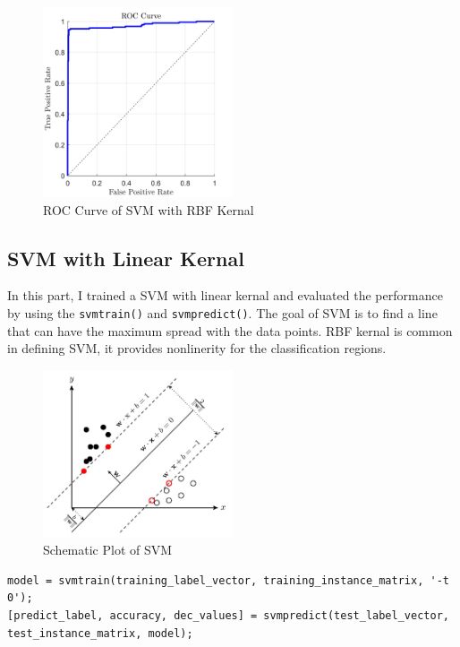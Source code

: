 \documentclass[a4paper,12pt]{article} %
\begin{document}
\begin{figure}[!htbp]
	\centering
	\includegraphics[width=0.5\textwidth]{RBFROC.jpg}
	\caption{ROC Curve of SVM with RBF Kernal}
	\label{fig:roc1}
\end{figure}

\subsection{SVM with Linear Kernal}
\hspace{0.7cm}
In this part, I trained a SVM with linear kernal and evaluated the performance by using the \texttt{svmtrain()} and \texttt{svmpredict()}. The goal of SVM is to find a line that can have the maximum spread with the data points. RBF kernal is common in defining SVM, it provides nonlinerity for the classification regions.

\begin{figure}[!htbp]
	\centering
	\includegraphics[width=0.5\textwidth]{SVM.png}
	\caption{Schematic Plot of SVM}
\end{figure}

\begin{footnotesize}
\begin{verbatim}
model = svmtrain(training_label_vector, training_instance_matrix, '-t 0');
[predict_label, accuracy, dec_values] = svmpredict(test_label_vector, test_instance_matrix, model);
\end{verbatim}
\end{footnotesize}
\end{document}
